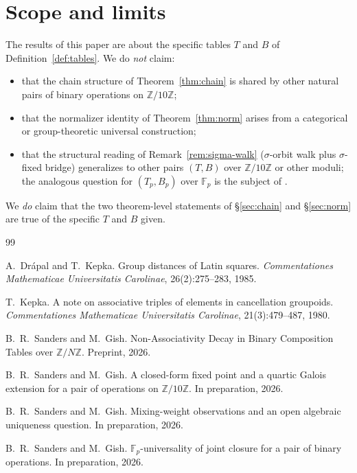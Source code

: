 \documentclass[11pt,reqno]{amsart}
\theoremstyle{plain}
\theoremstyle{definition}
\theoremstyle{remark}
\newcommand{\Z}{\mathbb{Z}}
\newcommand{\Zten}{\Z/10\Z}
\newcommand{\F}{\mathbb{F}}
\begin{document}
\section{Scope and limits}\label{sec:scope}

The results of this paper are about the specific tables $T$ and
$B$ of Definition~\ref{def:tables}. We do \emph{not} claim:
\begin{itemize}\setlength\itemsep{0pt}
\item that the chain structure of Theorem~\ref{thm:chain} is
shared by other natural pairs of binary operations on $\Zten$;
\item that the normalizer identity of Theorem~\ref{thm:norm}
arises from a categorical or group-theoretic universal
construction;
\item that the structural reading of Remark~\ref{rem:sigma-walk}
($\sigma$-orbit walk plus $\sigma$-fixed bridge) generalizes to
other pairs $(T,B)$ over $\Zten$ or other moduli; the analogous
question for $(T_{p},B_{p})$ over $\F_{p}$ is the subject of
\cite{SandersGish2026FpUniversality}.
\end{itemize}

We \emph{do} claim that the two theorem-level statements of
\S\ref{sec:chain} and \S\ref{sec:norm} are true of the specific
$T$ and $B$ given.

\begin{thebibliography}{99}

A.~Dr\'{a}pal and T.~Kepka.
\newblock Group distances of Latin squares.
\newblock \emph{Commentationes Mathematicae Universitatis Carolinae},
26(2):275--283, 1985.

T.~Kepka.
\newblock A note on associative triples of elements in cancellation groupoids.
\newblock \emph{Commentationes Mathematicae Universitatis Carolinae},
21(3):479--487, 1980.

B.~R.~Sanders and M.~Gish.
\newblock Non-Associativity Decay in Binary Composition Tables over
$\mathbb{Z}/N\mathbb{Z}$.
\newblock Preprint, 2026.

B.~R.~Sanders and M.~Gish.
\newblock A closed-form fixed point and a quartic Galois extension
for a pair of operations on $\mathbb{Z}/10\mathbb{Z}$.
\newblock In preparation, 2026.

B.~R.~Sanders and M.~Gish.
\newblock Mixing-weight observations and an open algebraic uniqueness
question.
\newblock In preparation, 2026.

B.~R.~Sanders and M.~Gish.
\newblock $\mathbb{F}_p$-universality of joint closure for a pair
of binary operations.
\newblock In preparation, 2026.

\end{thebibliography}
\end{document}
